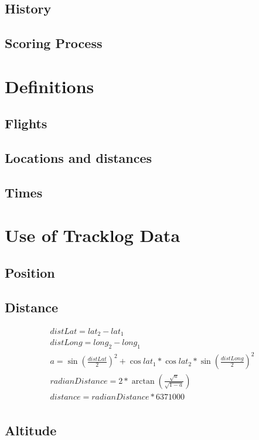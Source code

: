\documentclass{article}
\begin{document}
\subsection{History}
\subsection{Scoring Process}

\newpage
\section{Definitions}
\subsection{Flights}
\subsection{Locations and distances}
\subsection{Times}

\newpage
\section{Use of Tracklog Data}
\subsection{Position}
\subsection{Distance}

\begin{eqnarray*}
    distLat = lat_2 - lat_1 \\
    distLong = long_2 - long_1 \\
    a = \sin(\frac{distLat}{2})^2 + \cos lat_1 * \cos lat_2 * \sin(\frac{distLong}{2})^2 \\
    radianDistance = 2 * \arctan(\frac{\sqrt a}{\sqrt{1 - a}}) \\
    distance = radianDistance * 6371000 \\
\end{eqnarray*}

\subsection{Altitude}
\end{document}
